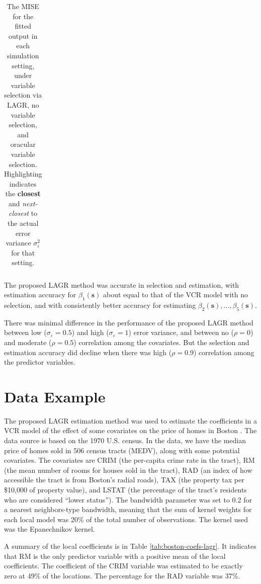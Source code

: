 \documentclass[english]{article}\usepackage[]{graphicx}\usepackage[]{color}
\theoremstyle{plain}
\theoremstyle{plain}
\begin{document}
\begin{table}
\begin{tabular}{ccc|c|ccc}
	\end{tabular}
	\caption{The MISE for the fitted output in each simulation setting, under variable selection via LAGR, no variable selection, and oracular variable selection. Highlighting indicates the \textbf{closest} and \emph{next-closest} to the actual error variance $\sigma_\varepsilon^2$ for that setting.}
	\label{tab:misey}
\end{table}

The proposed LAGR method was accurate in selection and estimation,
with estimation accuracy for $\beta_{1}(\bm{s})$ about equal to that
of the VCR model with no selection, and with consistently better accuracy
for estimating $\beta_{2}(\bm{s}),\dots,\beta_{5}(\bm{s})$.

There was minimal difference in the performance of the proposed LAGR
method between low ($\sigma_{\varepsilon}=0.5$) and high ($\sigma_{\varepsilon}=1$)
error variance, and between no ($\rho=0$) and moderate ($\rho=0.5$)
correlation among the covariates. But the selection and estimation
accuracy did decline when there was high ($\rho=0.9$) correlation
among the predictor variables.


\section{Data Example\label{sec:example}}




The proposed LAGR estimation method was used to estimate the coefficients
in a VCR model of the effect of some covariates on the price of homes
in Boston \citep{Harrison-Rubinfeld-1978,Gilley-Pace-1996,Pace-Gilley-1997}.
The data source is based on the 1970 U.S. census. In the data, we
have the median price of homes sold in 506 census tracts (MEDV), along
with some potential covariates. The covariates are CRIM (the per-capita
crime rate in the tract), RM (the mean number of rooms for houses
sold in the tract), RAD (an index of how accessible the tract is from
Boston's radial roads), TAX (the property tax per \$10,000 of property
value), and LSTAT (the percentage of the tract's residents who are
considered ``lower status''). The bandwidth parameter was set to
0.2 for a nearest neighbors-type bandwidth, meaning that the sum of
kernel weights for each local model was 20\% of the total number of
observations. The kernel used was the Epanechnikov kernel.

A summary of the local coefficients is in Table \ref{tab:boston-coefs-lagr}.
It indicates that RM is the only predictor variable with a positive
mean of the local coefficients. The coefficient of the CRIM variable
was estimated to be exactly zero at 49\%
of the locations. The percentage for the RAD variable was 37\%.
\end{document}
